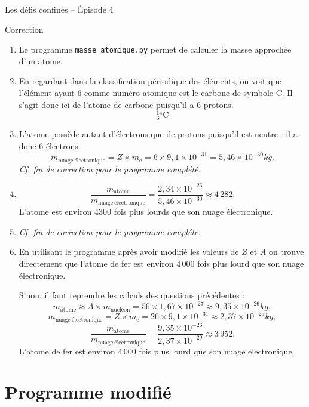 \documentclass[12pt,a4paper]{article}
\begin{document}
\begin{header}
Les défis confinés -- Épisode 4

Correction
\end{header}

\begin{enumerate}
\item Le programme \texttt{masse\_atomique.py} permet de calculer la masse approchée d'un atome.

\item En regardant dans la classification périodique des éléments, on voit que l'élément ayant 6 comme numéro atomique est le carbone de symbole C.
Il s'agit donc ici de l'atome de carbone puisqu'il a 6 protons.
\[^\text{14}_\text{6}\text{C}\]

\item L'atome possède autant d'électrons que de protons puisqu'il est neutre : il a donc 6 électrons.
\[m_\mathrm{nuage\ électronique} = Z \times m_\mathrm{e} = 6 \times 9{,}1\times 10^{-31} = \unit{5{,}46\times 10^{-30}}{kg}.\]
\emph{Cf. fin de correction pour le programme complété.}

\item
\[\frac{m_\mathrm{atome}}{m_\mathrm{nuage\ électronique}} = \frac{2{,}34\times 10^{-26}}{5{,}46\times 10^{-30}} \approx 4\,282.\]
L'atome est environ 4300  fois plus lourds que son nuage électronique.

\item \emph{Cf. fin de correction pour le programme complété.}

\item
En utilisant le programme après avoir modifié les valeurs de $Z$ et $A$ on trouve directement que l'atome de fer est environ 4\,000 fois plus lourd que son nuage électronique.

Sinon, il faut reprendre les calculs des questions précédentes :
\[m_\mathrm{atome} \approx A \times m_\mathrm{nucléon} = 56 \times 1{,}67\times 10^{-27} \approx \unit{9{,}35\times 10^{-26}}{kg},\]
\[m_\mathrm{nuage\ électronique} = Z \times m_\mathrm{e} = 26 \times 9{,}1\times 10^{-31} \approx \unit{2{,}37\times 10^{-29}}{kg},\]
\[\frac{m_\mathrm{atome}}{m_\mathrm{nuage\ électronique}} = \frac{9{,}35\times 10^{-26}}{2{,}37\times 10^{-29}} \approx 3\,952.\]
L'atome de fer est environ 4\,000 fois plus lourd que son nuage électronique.
\end{enumerate}

\newpage

\section*{Programme modifié}
\end{document}
